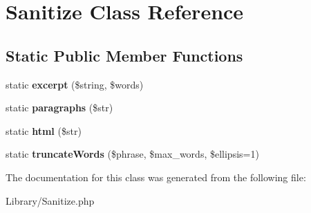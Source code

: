 \hypertarget{classSanitize}{
\section{Sanitize Class Reference}
\label{classSanitize}
}
\subsection*{Static Public Member Functions}
\begin{DoxyCompactItemize}
\item 
\hypertarget{classSanitize_a3f1f2431b4602a6881873ca42f047a4f}{
static {\bfseries excerpt} (\$string, \$words)}
\label{classSanitize_a3f1f2431b4602a6881873ca42f047a4f}

\item 
\hypertarget{classSanitize_a13659f258620d59d81105274d8835fcb}{
static {\bfseries paragraphs} (\$str)}
\label{classSanitize_a13659f258620d59d81105274d8835fcb}

\item 
\hypertarget{classSanitize_a047f2a14dea5335b577e06759eebbec0}{
static {\bfseries html} (\$str)}
\label{classSanitize_a047f2a14dea5335b577e06759eebbec0}

\item 
\hypertarget{classSanitize_a2f114a1a37387353d4a28378a6fcb685}{
static {\bfseries truncateWords} (\$phrase, \$max\_\-words, \$ellipsis=1)}
\label{classSanitize_a2f114a1a37387353d4a28378a6fcb685}

\end{DoxyCompactItemize}


The documentation for this class was generated from the following file:\begin{DoxyCompactItemize}
\item 
Library/Sanitize.php\end{DoxyCompactItemize}
